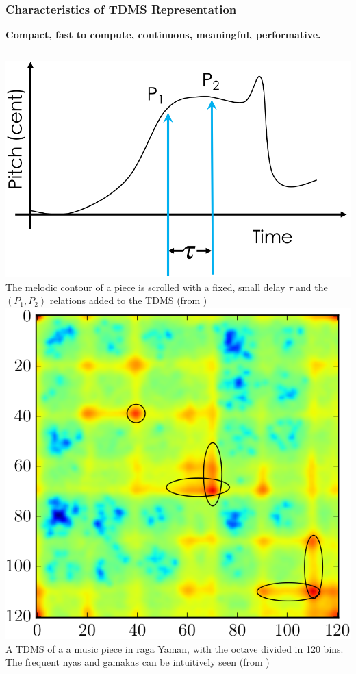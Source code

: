 \documentclass[hyperref={pdfpagelabels=false}]{beamer}
\begin{document}
     \begin{frame}
       \frametitle{Characteristics of TDMS Representation}
       \textbf{Compact, fast to compute, continuous, meaningful, performative.}
       \vspace{4mm}
       \begin{columns}
         \centering
          \includegraphics[scale=0.2]{tdms_line.png}
         \\\scriptsize{The melodic contour of a piece is scrolled with a fixed, small delay $\tau$ and the $(P_1, P_2)$ relations added to the TDMS (from \cite[p.163]{gulati-slides})}
         \centering
          \includegraphics[scale=0.2]{tdms.png}
         \\\scriptsize{A TDMS of a a music piece in r\=aga Yaman, with the octave divided in 120 bins. The frequent ny\=as and gamakas can be intuitively seen (from \cite[p.170]{gulati-slides})}
       \end{columns}
     \end{frame}
\end{document}
